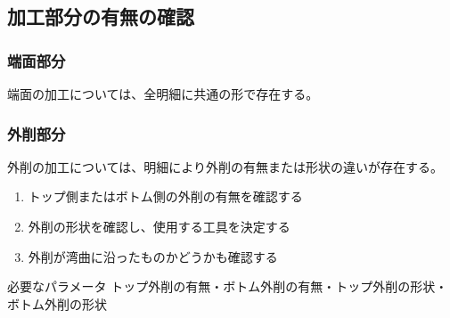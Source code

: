 \subsection{加工部分の有無の確認}

\subsubsection{端面部分}
端面の加工については、全明細に共通の形で存在する。

\subsubsection{外削部分}
外削の加工については、明細により外削の有無または形状の違いが存在する。
\begin{enumerate}
\item トップ側またはボトム側の外削の有無を確認する
\item 外削の形状を確認し、使用する工具を決定する
\item {}外削が湾曲に沿ったものかどうかも確認する
\end{enumerate}
\begin{Parameter}{必要なパラメータ}
トップ外削の有無・ボトム外削の有無・トップ外削の形状・ボトム外削の形状
\end{Parameter}

\clearpage
